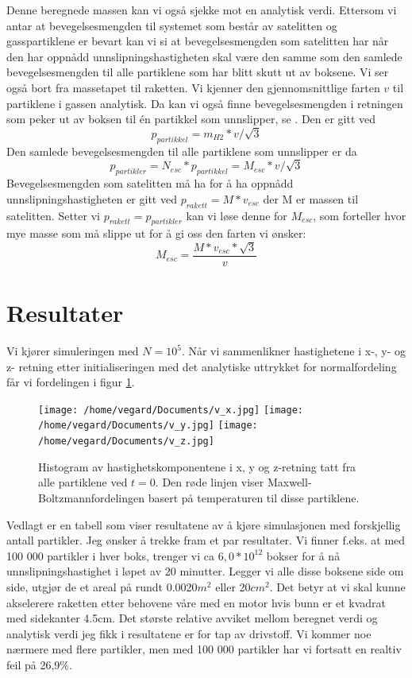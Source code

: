 \documentclass[reprint,english,notitlepage]{revtex4-1}  %
\begin{document}
Denne beregnede massen kan vi også sjekke mot en analytisk verdi. Ettersom vi antar at
 bevegelsesmengden til systemet som består av satelitten og gasspartiklene er bevart kan vi si at bevegelsesmengden som satelitten har når den har oppnådd unnslipningshastigheten skal være den samme som den samlede bevegelsesmengden til alle partiklene som har blitt skutt ut av boksene. Vi ser også bort fra massetapet til raketten. Vi kjenner den gjennomsnittlige farten $v$ til partiklene i gassen analytisk. Da kan vi også finne bevegelsesmengden i retningen som peker ut av boksen til én partikkel som unnslipper, se \citep{part1A}. Den er gitt ved
 \[
 p_{partikkel} = m_{H2}*v/\sqrt{3}
 \]
 Den samlede bevegelsesmengden til alle partiklene som unnslipper er da
 \[
 p_{partikler} = N_{esc} * p_{partikkel} = M_{esc} * v /\sqrt{3}
 \]
 Bevegelsesmengden som satelitten må ha for å ha oppnådd unnslipningshastigheten er gitt ved $p_{rakett} = M*v_{esc}$ der M er massen til satelitten. Setter vi $p_{rakett} = p_{partikler}$ kan vi løse denne for $M_{esc}$, som forteller hvor mye masse som må slippe ut for å gi oss den farten vi ønsker:
 \begin{equation}
   \label{eq:fuelmass}
   M_{esc} = \frac{M * v_{esc} * \sqrt{3}}{v}
 \end{equation}




\section{Resultater}

Vi kjører simuleringen med $N = 10^5$. Når vi sammenlikner hastighetene i x-, y- og z-
 retning etter initialiseringen med det analytiske uttrykket for normalfordeling\citep{part1A} får vi fordelingen i figur \ref{fig:boltzmann}.

\begin{figure}[htbp]
\texttt{[image: /home/vegard/Documents/v\_x.jpg]}
\texttt{[image: /home/vegard/Documents/v\_y.jpg]}
\texttt{[image: /home/vegard/Documents/v\_z.jpg]}
\caption{Histogram av hastighetskomponentene i x, y og z-retning tatt fra alle partiklene ved $t=0$. Den røde linjen viser Maxwell-Boltzmannfordelingen basert på temperaturen til disse partiklene.\label{fig:boltzmann}}
\end{figure}

Vedlagt er en tabell som viser resultatene av å kjøre simulasjonen med forskjellig antall
 partikler. Jeg ønsker å trekke fram et par resultater. Vi finner f.eks. at med 100 000 partikler i hver boks, trenger vi ca $6,0*10^12$ bokser for å nå unnslipningshastighet i løpet av 20 minutter. Legger vi alle disse boksene side om side, utgjør de et areal på rundt 0.0020$m^2$ eller 20$cm^2$. Det betyr at vi skal kunne akselerere raketten etter behovene våre med en motor hvis bunn er et kvadrat med sidekanter 4.5cm. Det største relative avviket mellom beregnet verdi og analytisk verdi jeg fikk i resultatene er for tap av drivstoff. Vi kommer noe nærmere med flere partikler, men med 100 000 partikler har vi fortsatt en realtiv feil på 26,9\%.
\end{document}
